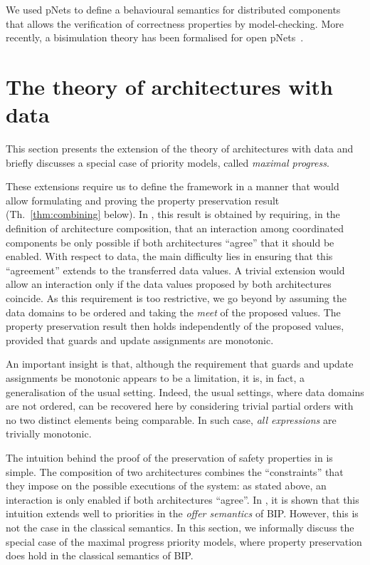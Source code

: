 \documentclass{llncs}
\newcommand{\newCoord}[1]{{\color{blue}#1}}
\newcommand{\thm}[1]{Th.~\ref{thm:#1}}
\begin{document}
We  used pNets to define a behavioural semantics for distributed components~\cite{AmeurBoulifa2017} that allows the verification of correctness properties  by model-checking. 
More recently, a bisimulation theory has been formalised for open pNets~\cite{HMZ-FORTE2016}.



\section{The theory of architectures with data}
\label{secn:archs}

This section presents the extension of the theory of
  architectures \cite{AttieBBJS16-architectures-faoc} with data and
  briefly discusses a special case of priority models, called
  \emph{maximal progress}.
%
  \newCoord{These extensions require us to define the framework in a
    manner that would allow formulating and proving the property
    preservation result (\thm{combining} below).  In
    \cite{AttieBBJS16-architectures-faoc}, this result is obtained by
    requiring, in the definition of architecture composition, that an
    interaction among coordinated components be only possible if both
    architectures ``agree'' that it should be enabled.  With respect
    to data, the main difficulty lies in ensuring that this
    ``agreement'' extends to the transferred data values.  A trivial
    extension would allow an interaction only if the data values
    proposed by both architectures coincide.  As this
    requirement is too restrictive, we go beyond by assuming the data
    domains to be ordered and taking the \emph{meet} of the proposed
    values.  The property preservation result then holds independently
    of the proposed values, provided that guards and update
    assignments are monotonic.

    An important insight is that, although the requirement that guards
    and update assignments be monotonic appears to be a limitation, it
    is, in fact, a generalisation of the usual setting.  Indeed, the
    usual settings, where data domains are not ordered, can be
    recovered here by considering trivial partial orders with no two
    distinct elements being comparable.  In such case, \emph{all
      expressions} are trivially monotonic.

    The intuition behind the proof of the preservation of safety
    properties in \cite{AttieBBJS16-architectures-faoc} is simple.
    The composition of two architectures combines the ``constraints''
    that they impose on the possible executions of the system: as
    stated above, an interaction is only enabled if both architectures
    ``agree''.  In \cite{Baranov17-phd}, it is shown that this
    intuition extends well to priorities in the \emph{offer semantics}
    of BIP.  However, this is not the case in the classical semantics.
    In this section, we informally discuss the special case of the
    maximal progress priority models, where property preservation does
    hold in the classical semantics of BIP.
%
}
  
\end{document}
